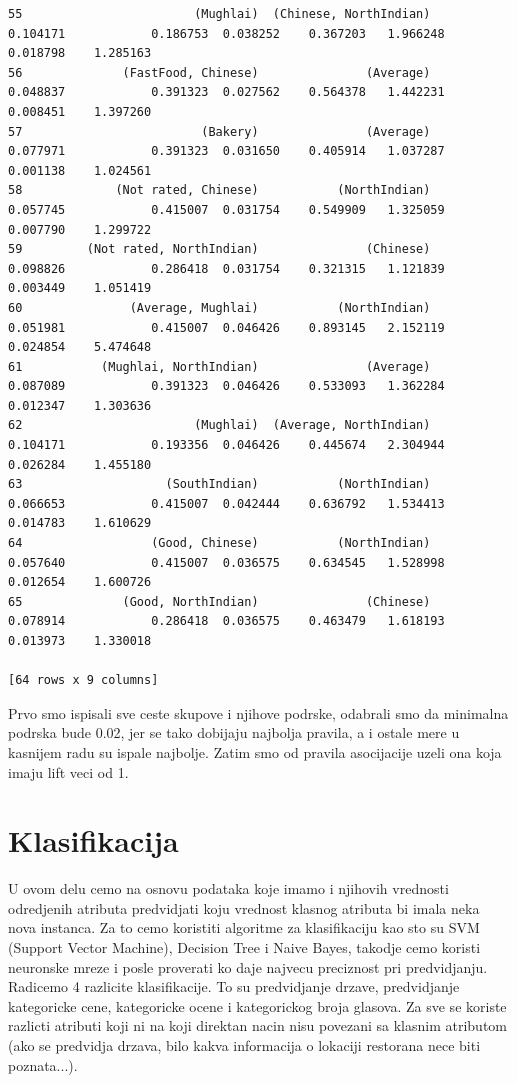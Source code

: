 \documentclass[11pt]{article} %
\begin{document}
\begin{lstlisting}
55                        (Mughlai)  (Chinese, NorthIndian)            0.104171            0.186753  0.038252    0.367203   1.966248  0.018798    1.285163
56              (FastFood, Chinese)               (Average)            0.048837            0.391323  0.027562    0.564378   1.442231  0.008451    1.397260
57                         (Bakery)               (Average)            0.077971            0.391323  0.031650    0.405914   1.037287  0.001138    1.024561
58             (Not rated, Chinese)           (NorthIndian)            0.057745            0.415007  0.031754    0.549909   1.325059  0.007790    1.299722
59         (Not rated, NorthIndian)               (Chinese)            0.098826            0.286418  0.031754    0.321315   1.121839  0.003449    1.051419
60               (Average, Mughlai)           (NorthIndian)            0.051981            0.415007  0.046426    0.893145   2.152119  0.024854    5.474648
61           (Mughlai, NorthIndian)               (Average)            0.087089            0.391323  0.046426    0.533093   1.362284  0.012347    1.303636
62                        (Mughlai)  (Average, NorthIndian)            0.104171            0.193356  0.046426    0.445674   2.304944  0.026284    1.455180
63                    (SouthIndian)           (NorthIndian)            0.066653            0.415007  0.042444    0.636792   1.534413  0.014783    1.610629
64                  (Good, Chinese)           (NorthIndian)            0.057640            0.415007  0.036575    0.634545   1.528998  0.012654    1.600726
65              (Good, NorthIndian)               (Chinese)            0.078914            0.286418  0.036575    0.463479   1.618193  0.013973    1.330018

[64 rows x 9 columns]
\end{lstlisting}
Prvo smo ispisali sve ceste skupove i njihove podrske, odabrali smo da minimalna podrska bude 0.02, jer se tako dobijaju najbolja pravila, a i ostale mere u 
kasnijem radu su ispale najbolje. Zatim smo od pravila asocijacije uzeli ona koja imaju lift veci od 1.

\newpage
\section{Klasifikacija}
U ovom delu cemo na osnovu podataka koje imamo i njihovih vrednosti odredjenih atributa predvidjati koju vrednost klasnog atributa bi imala neka nova instanca.
Za to cemo koristiti algoritme za klasifikaciju kao sto su SVM (Support Vector Machine), Decision Tree i Naive Bayes, takodje 
cemo koristi neuronske mreze i posle proverati ko daje najvecu preciznost pri predvidjanju.
\newline
Radicemo 4 razlicite klasifikacije. To su predvidjanje drzave, predvidjanje kategoricke cene, kategoricke ocene i kategorickog broja glasova. Za sve se koriste 
razlicti atributi koji ni na koji direktan nacin nisu povezani sa klasnim atributom (ako se predvidja drzava, bilo kakva informacija o lokaciji restorana nece 
biti poznata...).
\end{document}
